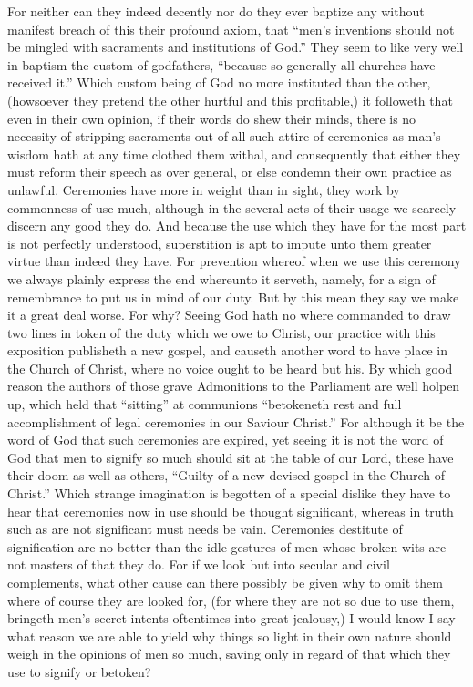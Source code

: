  For neither can they indeed decently nor do they ever baptize any without manifest breach of this their profound axiom, that “men’s inventions should not be mingled with sacraments and institutions of God.” They seem to like very well in baptism the custom of godfathers, “because so generally all churches have received it.” Which custom being of God no more instituted than the other, (howsoever they pretend the other hurtful and this profitable,) it followeth that even in their own opinion, if their words do shew their minds, there is no necessity of stripping sacraments out of all such attire of ceremonies as man’s wisdom hath at any time clothed them withal, and consequently that either they must reform their speech as over general, or else condemn their own practice as unlawful.
Ceremonies have more in weight than in sight, they work by commonness of use much, although in the several acts of their usage we scarcely discern any good they do. And because the use which they have for the most part is not perfectly understood, superstition is apt to impute unto them greater virtue than indeed they have. For prevention whereof when we use this ceremony we always plainly express the end whereunto it serveth, namely, for a sign of remembrance to put us in mind of our duty.
But by this mean they say we make it a great deal worse.  For why?
 Seeing God hath no where commanded to draw two lines in token of the duty which we owe to Christ, our practice with this exposition publisheth a new gospel, and causeth another word to have place in the Church of Christ, where no voice ought to be heard but his.
By which good reason the authors of those grave Admonitions to the Parliament are well holpen up, which held that “sitting” at communions “betokeneth rest and full accomplishment of legal ceremonies in our Saviour Christ.” For although it be the word of God that such ceremonies are expired, yet seeing it is not the word of God that men to signify so much should sit at the table of our Lord, these have their doom as well as others, “Guilty of a new-devised gospel in the Church of Christ.”
Which strange imagination is begotten of a special dislike they have to hear that ceremonies now in use should be thought significant, whereas in truth such as are not significant must needs be vain. Ceremonies destitute of signification are no better than the idle gestures of men whose broken wits are not masters of that they do. For if we look but into secular and civil complements, what other cause can there possibly be given why to omit them where of course they are looked for, (for where they are not so due to use them, bringeth men’s secret intents oftentimes into great jealousy,) I would know I say what reason we are able to yield why things so light in their own nature should weigh in the opinions of men so much, saving only in regard of that which they use to signify or betoken?
